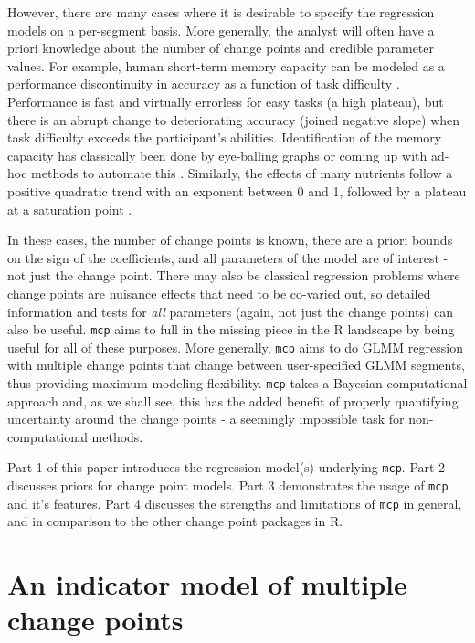 \documentclass[
  american,
]{article}
\begin{document}
However, there are many cases where it is desirable to specify the regression models on a per-segment basis. More generally, the analyst will often have a priori knowledge about the number of change points and credible parameter values. For example, human short-term memory capacity can be modeled as a performance discontinuity in accuracy as a function of task difficulty \citep{cowan2000, camos2008, leibovich-raveh2018}. Performance is fast and virtually errorless for easy tasks (a high plateau), but there is an abrupt change to deteriorating accuracy (joined negative slope) when task difficulty exceeds the participant's abilities. Identification of the memory capacity has classically been done by eye-balling graphs or coming up with ad-hoc methods to automate this \citep{leibovich-raveh2018}. Similarly, the effects of many nutrients follow a positive quadratic trend with an exponent between 0 and 1, followed by a plateau at a saturation point \citep{pesti2009}.

In these cases, the number of change points is known, there are a priori bounds on the sign of the coefficients, and all parameters of the model are of interest - not just the change point. There may also be classical regression problems where change points are nuisance effects that need to be co-varied out, so detailed information and tests for \emph{all} parameters (again, not just the change points) can also be useful. \texttt{mcp} aims to full in the missing piece in the R landscape by being useful for all of these purposes. More generally, \texttt{mcp} aims to do GLMM regression with multiple change points that change between user-specified GLMM segments, thus providing maximum modeling flexibility. \texttt{mcp} takes a Bayesian computational approach and, as we shall see, this has the added benefit of properly quantifying uncertainty around the change points - a seemingly impossible task for non-computational methods.

Part 1 of this paper introduces the regression model(s) underlying \texttt{mcp}. Part 2 discusses priors for change point models. Part 3 demonstrates the usage of \texttt{mcp} and it's features. Part 4 discusses the strengths and limitations of \texttt{mcp} in general, and in comparison to the other change point packages in R.

\hypertarget{an-indicator-model-of-multiple-change-points}{%
\section{An indicator model of multiple change points}\label{an-indicator-model-of-multiple-change-points}}
\end{document}
